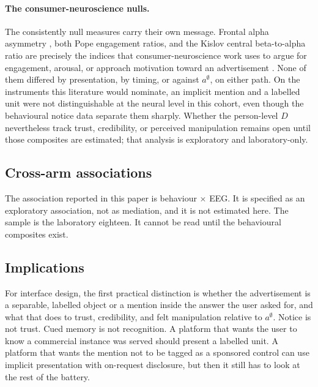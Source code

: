 \documentclass[english]{article}
\begin{document}
\paragraph{The consumer-neuroscience nulls.}
The consistently null measures carry their own message. Frontal alpha asymmetry \cite{allen2004asymmetry}, both Pope engagement ratios, and the Kislov central beta-to-alpha ratio \cite{kislov2023central} are precisely the indices that consumer-neuroscience work uses to argue for engagement, arousal, or approach motivation toward an advertisement \cite{vecchiato2011spectral,boksem2015brain,alsharif2025eeg}. None of them differed by presentation, by timing, or against \(a^{\emptyset}\), on either path. On the instruments this literature would nominate, an implicit mention and a labelled unit were not distinguishable at the neural level in this cohort, even though the behavioural notice data separate them sharply. Whether the person-level \(D\) nevertheless track trust, credibility, or perceived manipulation remains open until those composites are estimated; that analysis is exploratory and laboratory-only.

\subsection{Cross-arm associations}
\label{sec:disc-combos}

The association reported in this paper is behaviour \(\times\) EEG. It is specified as an exploratory association, not as mediation, and it is not estimated here. The sample is the laboratory eighteen. It cannot be read until the behavioural composites exist.

\subsection{Implications}

For interface design, the first practical distinction is whether the advertisement is a separable, labelled object or a mention inside the answer the user asked for, and what that does to trust, credibility, and felt manipulation relative to \(a^{\emptyset}\). Notice is not trust. Cued memory is not recognition. A platform that wants the user to know a commercial instance was served should present a labelled unit. A platform that wants the mention not to be tagged as a sponsored control can use implicit presentation with on-request disclosure, but then it still has to look at the rest of the battery.
\end{document}
